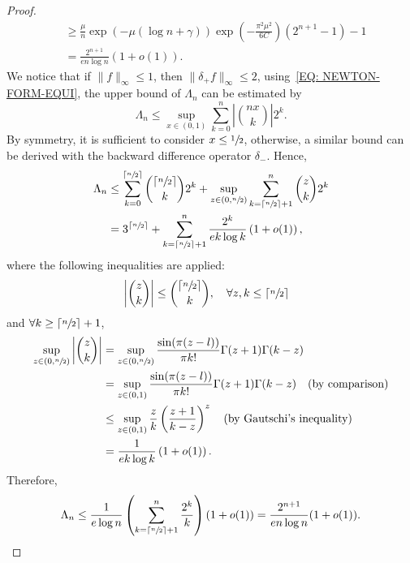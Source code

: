 \begin{proof}
\begin{equation}
\begin{aligned}
        & \ge \frac{\mu}{n} \exp(-\mu (\log n + \gamma))\exp\left(-\frac{\pi^2\mu^2}{6C}\right)(2^{n+1} - 1) - 1 \\
        & =\frac{2^{n+1}}{e n \log n} \left(1 + o(1)\right).
    \end{aligned}
    \end{equation}
    We notice that if $\|f\|_{\infty}\le 1$,  then $\|\delta_{+} f\|_{\infty}\le 2$, using~\eqref{EQ: NEWTON-FORM-EQUI}, the upper bound of $\Lambda_n$ can be estimated by
    \begin{equation}
        \Lambda_n \le \sup_{x\in (0, 1)}\sum_{k=0}^n \left|\binom{nx}{k}\right| 2^k.
    \end{equation}
    By symmetry, it is sufficient to consider $x\le \sfrac{1}{2}$, otherwise, a similar bound can be derived with the backward difference operator $\delta_{-}$. Hence, 
    \begin{equation}
    \begin{aligned}
        \Lambda_n &\le \sum_{k=0}^{\lceil \sfrac{n}{2} \rceil} \binom{\lceil \sfrac{n}{2} \rceil}{k} 2^k + \sup_{z\in (0, \sfrac{n}{2})}  \sum_{k=\lceil \sfrac{n}{2} \rceil + 1}^{n} \binom{z}{k} 2^k \\
        &= 3^{ \lceil \sfrac{n}{2} \rceil } + \sum_{k = \lceil\sfrac{n}{2} \rceil + 1}^n  \frac{2^k}{e k \log k}\left(1 + o(1)\right),
    \end{aligned}
    \end{equation}
    where the following inequalities are applied:  
    \begin{equation}
        \begin{aligned}
            &\left|\binom{z}{k}\right|\le \binom{\lceil \sfrac{n}{2} \rceil}{k},\quad \forall z,k\le \lceil \sfrac{n}{2} \rceil
        \end{aligned}
    \end{equation} 
    and $\forall k \ge \lceil\sfrac{n}{2} \rceil + 1$, 
    \begin{equation}
        \begin{aligned}
            \sup_{z\in (0, \sfrac{n}{2})}\left|\binom{z}{k}\right| &=  \sup_{z\in (0, \sfrac{n}{2})} \frac{\sin(\pi(z - l))}{\pi k!} \Gamma(z+1)\Gamma(k - z) \\
            &=\sup_{z\in (0, 1)} \frac{\sin(\pi(z - l))}{\pi k!} \Gamma(z+1)\Gamma(k - z) \quad (\text{by comparison})\\&\le \sup_{z\in (0, 1)}\frac{z}{k}\left(\frac{z+1}{k - z}\right)^z \quad (\text{by Gautschi's inequality})\\
            &= \frac{1}{e k \log k}\left(1 + o(1)\right).
        \end{aligned}
    \end{equation}
    Therefore, 
    \begin{equation}
        \Lambda_n \le \frac{1}{e \log n} \left( \sum_{k=\lceil \sfrac{n}{2}\rceil+1}^n \frac{2^k}{k}\right) (1 + o(1)) =  \frac{2^{n+1}}{e n \log n}  (1 + o(1)).
    \end{equation}
\end{proof}
